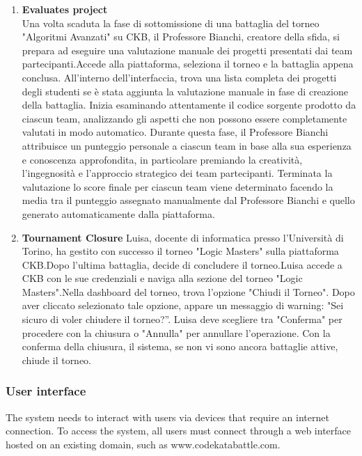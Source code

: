 \begin{enumerate}[label=\textbf{\Alph*}.]
\item \textbf{Evaluates project} \\
Una volta scaduta la fase di sottomissione di una battaglia del torneo "Algoritmi Avanzati" su CKB, il Professore Bianchi, creatore della sfida, si prepara ad eseguire una valutazione manuale dei progetti presentati dai team partecipanti.Accede alla piattaforma, seleziona il torneo e la battaglia appena conclusa. All'interno dell'interfaccia, trova una lista completa dei progetti degli  studenti se è stata aggiunta la valutazione manuale in fase di creazione della battaglia.
Inizia esaminando attentamente il codice sorgente prodotto da ciascun team, analizzando gli aspetti che non possono essere completamente valutati in modo automatico.
Durante questa fase, il Professore Bianchi attribuisce un punteggio personale a ciascun team in base alla sua esperienza e conoscenza approfondita, in particolare premiando la creatività, l'ingegnosità e l'approccio strategico dei team partecipanti. Terminata la valutazione lo score finale per ciascun team viene determinato facendo la media tra il punteggio assegnato manualmente dal Professore Bianchi e quello generato automaticamente dalla piattaforma.
\item \textbf{Tournament Closure}
Luisa, docente di informatica presso l'Università di Torino, ha gestito con successo il torneo "Logic Masters" sulla piattaforma CKB.Dopo l'ultima battaglia, decide di concludere il torneo.Luisa accede a CKB con le sue credenziali e naviga alla sezione del torneo "Logic Masters".Nella dashboard del torneo, trova l'opzione "Chiudi il Torneo".	Dopo aver cliccato selezionato tale opzione, appare un messaggio di warning: "Sei sicuro di voler chiudere il torneo?”.
Luisa deve scegliere tra "Conferma" per procedere con la chiusura o "Annulla" per annullare l’operazione. Con la conferma della chiusura, il sistema, se non vi sono ancora battaglie attive, chiude il torneo.
\end{enumerate}
\subsubsection{User interface}
The system needs to interact with users via devices that require an internet connection. To access the system, all users must connect through a web interface hosted on an existing domain, such as www.codekatabattle.com.
